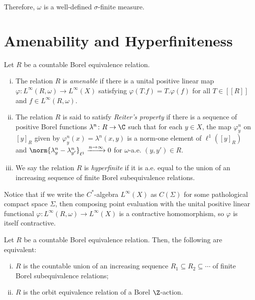 \documentclass[10pt]{mypackage}
\begin{document}
Therefore, $\omega$ is a well-defined $\sigma$-finite measure.
\section{Amenability and Hyperfiniteness}%
\begin{definition}
  Let $R$ be a countable Borel equivalence relation.
  \begin{enumerate}[(i)]
    \item The relation $R$ is \textit{amenable} if there is a unital positive linear map $\varphi\colon L^{\infty}\left( R,\omega \right)\to L^{\infty}\left( X \right)$ satisfying $\varphi\left( T.f \right) = T.\varphi(f)$ for all $T\in \left[ \left[ R \right] \right]$ and $f\in L^{\infty}\left( R,\omega \right)$.
    \item The relation $R$ is said to satisfy \textit{Reiter's property} if there is a sequence of positive Borel functions $\lambda^n\colon R\to\C$ such that for each $y\in X$, the map $\varphi^n_y$ on $\left[ y \right]_R$ given by $\varphi^n_y(x) = \lambda^n\left( x,y \right)$ is a norm-one element of $\ell^1\left( \left[ y \right]_R \right)$ and $\norm{\lambda^n_y - \lambda^n_{y'}}_{\ell^1}\xrightarrow{n\to \infty} 0$ for $\omega$-a.e. $\left( y,y' \right)\in R$.
    \item We say the relation $R$ is \textit{hyperfinite} if it is a.e. equal to the union of an increasing sequence of finite Borel subequivalence relations.
  \end{enumerate}
\end{definition}
Notice that if we write the $C^{\ast}$-algebra $L^{\infty}\left( X \right)$ as $C\left( \Sigma \right)$ for some pathological compact space $\Sigma$, then composing point evaluation with the unital positive linear functional $\varphi\colon L^{\infty}\left( R,\omega \right)\to L^{\infty}\left( X \right)$ is a contractive homomorphism, so $\varphi$ is itself contractive.
\begin{theorem}
  Let $R$ be a countable Borel equivalence relation. Then, the following are equivalent:
  \begin{enumerate}[(i)]
    \item $R$ is the countable union of an increasing sequence $R_1\subseteq R_2\subseteq\cdots$ of finite Borel subequivalence relations;
    \item $R$ is the orbit equivalence relation of a Borel $\Z$-action.
  \end{enumerate}
\end{theorem}
\end{document}
